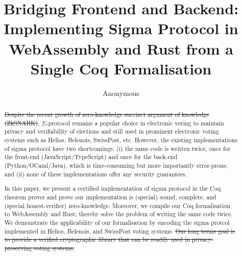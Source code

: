 \documentclass[conference,compsoc]{IEEEtran}
\begin{document}
\title{Bridging Frontend and Backend: Implementing Sigma Protocol in WebAssembly and Rust from a Single Coq Formalisation}

\author{Anonymous}

\maketitle

\begin{abstract}
  \st{Despite the recent growth of zero-knowledge succinct argument 
  of knowledge (ZkSNARK)}, 
  $\Sigma$-protocol remains a popular choice in electronic voting to maintain privacy 
  and verifiability of elections and still used in prominent electronic voting systems such as 
  Helios, Belenois, SwissPost, etc. However, 
  the existing implementations of sigma protocol have two 
  shortcomings: (i) the same code is written twice, once for the front-end (JavaScript/TypeScript)
  and once for the back-end (Python/OCaml/Java), which is time-consuming but more importantly error-prone, 
  and (ii) none of these implementations offer any security guarantees. 
  
  In this paper, we present a certified implementation of sigma protocol in the Coq theorem prover and
  prove our implementation is (special) sound, complete, and 
  (special honest-verifier) zero-knowledge. Moreover, 
  we compile our Coq formalisation to WebAssembly and Rust; 
  thereby solve the problem of writing the same code twice. 
  We demonstrate the applicability of our
  formalisation by encoding the sigma protcol implemented in 
  Helios, Belenois, and SwissPost voting systems. 
  \st{Our long terms goal is to provide a verified cryptographic library that can be 
  readily used in privacy-preserving voting systems.}
\end{abstract}





%
\IEEEpeerreviewmaketitle
\end{document}
